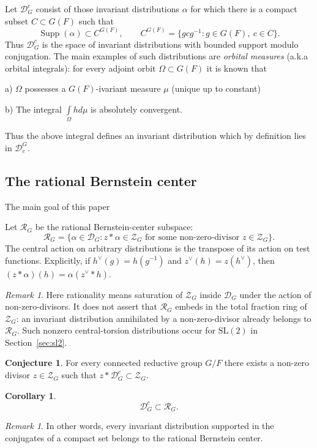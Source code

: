 \documentclass[11pt,a4paper]{amsart}
\DeclareMathOperator{\Supp}{Supp}
\newcommand{\mcD}{\mathcal D}
\newcommand{\mcZ}{\mathcal Z}
\newcommand{\mcR}{\mathcal R}
\newtheorem{corollary}[theorem]{Corollary}
\theoremstyle{definition}
\newtheorem{conjecture}[theorem]{Conjecture}
\theoremstyle{remark}
\newtheorem{remark}[theorem]{Remark}
\newtheorem*{remark*}{Remark}
\begin{document}
Let $\mcD_G^c$ consist of those invariant distributions $\alpha$ for
which there is a compact subset $C\subset G(F)$ such that
$$
 \Supp(\alpha)\subset C^{G(F)},\qquad
 C^{G(F)}=\{gcg^{-1}:g\in G(F),\ c\in C\}.
$$
Thus $\mcD_G^c$ is the space of invariant distributions with bounded
support modulo conjugation. The main examples of such distributions are {\em orbital measures} (a.k.a orbital integrals):
for every adjoint orbit $\Omega\subset G(F)$ it is known that 

a) $\Omega$ possesses a $G(F)$-ivariant measure $\mu$ (unique up to constant)

b) The integral $\int\limits_{\Omega} hd\mu$ is absolutely convergent. 

\noindent
Thus the above integral defines an invariant distribution which by definition lies in $\mcD^G_c$. 
\subsection{The rational Bernstein center}
The main goal of this paper 

Let
$\mcR_G$ be the rational Bernstein-center subspace:
$$
 \mcR_G=\{\alpha\in\mcD_G:
   z*\alpha\in\mcZ_G\text{ for some non-zero-divisor }z\in\mcZ_G\}.
$$
The central action on arbitrary distributions is the transpose of its
action on test functions. Explicitly, if $h^\vee(g)=h(g^{-1})$ and
$z^\vee(h)=z(h^\vee)$, then
$(z*\alpha)(h)=\alpha(z^\vee*h)$.

\begin{remark*}
Here rationality means saturation of $\mcZ_G$ inside $\mcD_G$ under
the action of non-zero-divisors. It does not assert that $\mcR_G$
embeds in the total fraction ring of $\mcZ_G$: an invariant
distribution annihilated by a non-zero-divisor already belongs to
$\mcR_G$. Such nonzero central-torsion distributions occur for
$\mathrm{SL}(2)$ in Section~\ref{sec:sl2}.
\end{remark*}

\begin{conjecture}\label{conj:denominator}
For every connected reductive group $G/F$ there exists a non-zero divisor $z\in \mcZ _G$ such that $z\ast \mcD_G^c \subset \mcZ _G$. \end{conjecture}
\begin{corollary}
$$
 {\mcD_G^c\subset\mcR_G.}
$$ \end{corollary}
\begin{remark}In other words, every invariant distribution  supported in the conjugates of a compact set belongs to the rational Bernstein center.\end{remark}
\end{document}
